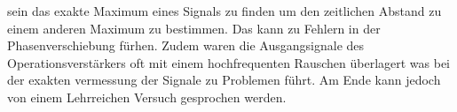 sein das exakte Maximum eines Signals zu finden um den zeitlichen Abstand zu einem anderen Maximum zu bestimmen.
Das kann zu Fehlern in der Phasenverschiebung fürhen. Zudem waren die Ausgangsignale des Operationsverstärkers
oft mit einem hochfrequenten Rauschen überlagert was bei der exakten vermessung der Signale zu Problemen führt.
Am Ende kann jedoch von einem Lehrreichen Versuch gesprochen werden.
























